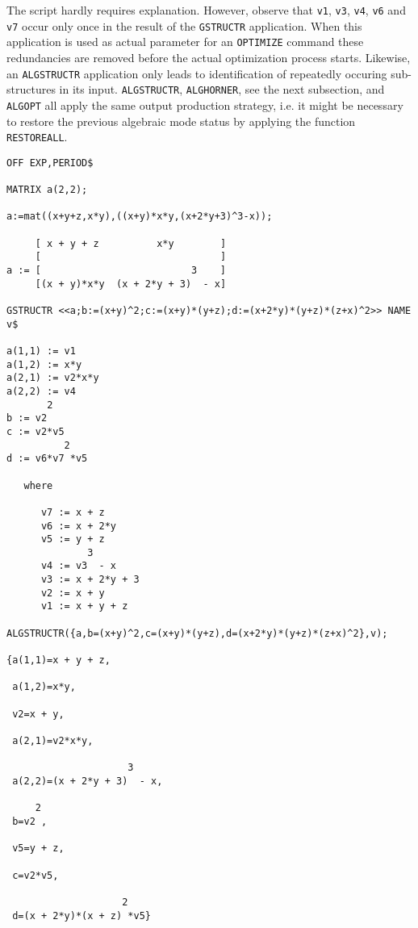 The script hardly requires explanation. However, observe 
that {\tt v1}, {\tt v3}, {\tt v4}, {\tt v6} and {\tt v7} occur only once 
in the result of the {\tt GSTRUCTR} application. When this application
is used as actual parameter for an {\tt OPTIMIZE} command
these redundancies are removed before the actual optimization process starts.
Likewise,
an {\tt ALGSTRUCTR} application only leads to identification of repeatedly
occuring sub-structures in its input. 
{\tt ALGSTRUCTR}, {\tt ALGHORNER}, see the next subsection, and {\tt ALGOPT}
all apply the same output production strategy, i.e. it might be necessary to
restore the previous algebraic mode status by applying the 
function {\tt RESTOREALL}.
{\small
\begin{verbatim}
OFF EXP,PERIOD$

MATRIX a(2,2);

a:=mat((x+y+z,x*y),((x+y)*x*y,(x+2*y+3)^3-x));

     [ x + y + z          x*y        ]
     [                               ]
a := [                          3    ]
     [(x + y)*x*y  (x + 2*y + 3)  - x]

GSTRUCTR <<a;b:=(x+y)^2;c:=(x+y)*(y+z);d:=(x+2*y)*(y+z)*(z+x)^2>> NAME v$

a(1,1) := v1
a(1,2) := x*y
a(2,1) := v2*x*y
a(2,2) := v4
       2
b := v2
c := v2*v5
          2
d := v6*v7 *v5

   where

      v7 := x + z
      v6 := x + 2*y
      v5 := y + z
              3
      v4 := v3  - x
      v3 := x + 2*y + 3
      v2 := x + y
      v1 := x + y + z

ALGSTRUCTR({a,b=(x+y)^2,c=(x+y)*(y+z),d=(x+2*y)*(y+z)*(z+x)^2},v);

{a(1,1)=x + y + z,

 a(1,2)=x*y,

 v2=x + y,

 a(2,1)=v2*x*y,

                     3
 a(2,2)=(x + 2*y + 3)  - x,

     2
 b=v2 ,

 v5=y + z,

 c=v2*v5,

                    2
 d=(x + 2*y)*(x + z) *v5}
\end{verbatim}}
